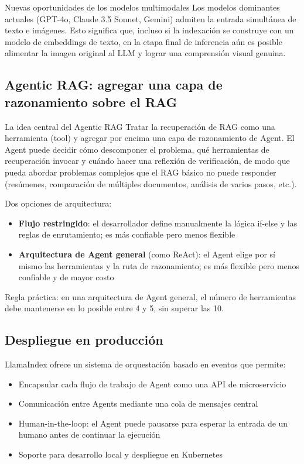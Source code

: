 \begin{knowledgebox}{Nuevas oportunidades de los modelos multimodales}
Los modelos dominantes actuales (GPT-4o, Claude 3.5 Sonnet, Gemini) admiten la entrada simultánea de texto e imágenes. Esto significa que, incluso si la indexación se construye con un modelo de embeddings de texto, en la etapa final de inferencia aún es posible alimentar la imagen original al LLM y lograr una comprensión visual genuina.
\end{knowledgebox}

\subsection{Agentic RAG: agregar una capa de razonamiento sobre el RAG}

\begin{importantbox}{La idea central del Agentic RAG}
Tratar la recuperación de RAG como una herramienta (tool) y agregar por encima una capa de razonamiento de Agent. El Agent puede decidir cómo descomponer el problema, qué herramientas de recuperación invocar y cuándo hacer una reflexión de verificación, de modo que pueda abordar problemas complejos que el RAG básico no puede responder (resúmenes, comparación de múltiples documentos, análisis de varios pasos, etc.).
\end{importantbox}

Dos opciones de arquitectura:
\begin{itemize}
    \item \textbf{Flujo restringido}: el desarrollador define manualmente la lógica if-else y las reglas de enrutamiento; es más confiable pero menos flexible
    \item \textbf{Arquitectura de Agent general} (como ReAct): el Agent elige por sí mismo las herramientas y la ruta de razonamiento; es más flexible pero menos confiable y de mayor costo
\end{itemize}

Regla práctica: en una arquitectura de Agent general, el número de herramientas debe mantenerse en lo posible entre 4 y 5, sin superar las 10.

\subsection{Despliegue en producción}

LlamaIndex ofrece un sistema de orquestación basado en eventos que permite:
\begin{itemize}
    \item Encapsular cada flujo de trabajo de Agent como una API de microservicio
    \item Comunicación entre Agents mediante una cola de mensajes central
    \item Human-in-the-loop: el Agent puede pausarse para esperar la entrada de un humano antes de continuar la ejecución
    \item Soporte para desarrollo local y despliegue en Kubernetes
\end{itemize}

